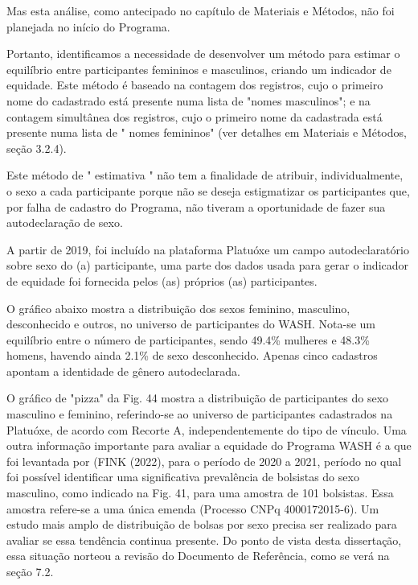 Mas esta análise, como antecipado no capítulo de Materiais e Métodos, não foi planejada no início do Programa.

Portanto, identificamos a necessidade de desenvolver um método para estimar o equilíbrio entre participantes femininos e masculinos, criando um indicador de equidade. Este método é baseado na contagem dos registros, cujo o primeiro nome do cadastrado está presente numa lista de "nomes masculinos"; e na contagem simultânea dos registros, cujo o primeiro nome da cadastrada está presente numa lista de " nomes femininos" (ver detalhes em Materiais e Métodos, seção 3.2.4).

Este método de " estimativa " não tem a finalidade de atribuir, individualmente, o sexo a cada participante porque não se deseja estigmatizar os participantes que, por falha de cadastro do Programa, não tiveram a oportunidade de fazer sua autodeclaração de sexo.

A partir de 2019, foi incluído na plataforma Platuóxe um campo autodeclaratório sobre sexo do (a) participante, uma parte dos dados usada para gerar o indicador de equidade foi fornecida pelos (as) próprios (as) participantes.

O gráfico abaixo mostra a distribuição dos sexos feminino, masculino,  desconhecido e outros, no universo de participantes do WASH. Nota-se um equilíbrio entre o número de participantes, sendo 49.4\%  mulheres e 48.3\% homens, havendo ainda 2.1\% de sexo desconhecido. Apenas cinco cadastros apontam a identidade de gênero autodeclarada.

O gráfico de "pizza" da Fig. 44 mostra a distribuição de participantes do sexo masculino e feminino, referindo-se ao universo de participantes cadastrados na Platuóxe, de acordo com Recorte A, independentemente do tipo de vínculo. Uma outra informação importante para avaliar a equidade do Programa  WASH é a que foi levantada por (FINK (2022), para o período de 2020 a 2021, período no qual foi possível identificar uma significativa prevalência de bolsistas do sexo masculino, como indicado na Fig. 41, para uma amostra de 101 bolsistas. Essa amostra refere-se a uma única emenda (Processo CNPq 4000172015-6). Um estudo mais amplo de distribuição de bolsas por sexo precisa ser realizado para avaliar se essa tendência continua presente. Do ponto de vista desta dissertação, essa situação norteou a revisão do Documento de Referência, como se verá na seção 7.2.



